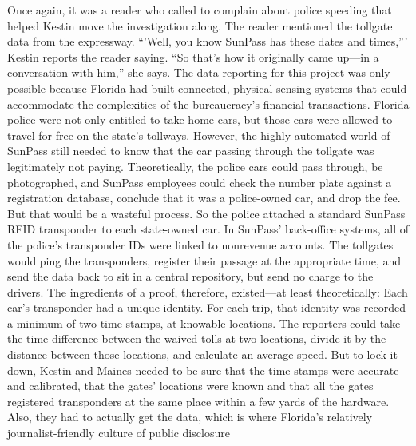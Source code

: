 Once again, it was a reader who called to complain about police speeding
that helped Kestin move the investigation along. The reader mentioned the
tollgate data from the expressway. ``'Well, you know SunPass has these dates
and times,''' Kestin reports the reader saying. ``So that's how it originally
came up—in a conversation with him,'' she says.
The data reporting for this project was only possible because Florida had
built connected, physical sensing systems that could accommodate the
complexities of the bureaucracy's financial transactions. Florida police were
not only entitled to take-home cars, but those cars were allowed to travel
for free on the state's tollways. However, the highly automated world of
SunPass still needed to know that the car passing through the tollgate was
legitimately not paying. Theoretically, the police cars could pass through,
be photographed, and SunPass employees could check the number plate
against a registration database, conclude that it was a police-owned car, and
drop the fee. But that would be a wasteful process. So the police attached a
standard SunPass RFID transponder to each state-owned car. In SunPass'
back-office systems, all of the police's transponder IDs were linked to nonrevenue
accounts. The tollgates would ping the transponders, register their
passage at the appropriate time, and send the data back to sit in a central
repository, but send no charge to the drivers.
The ingredients of a proof, therefore, existed—at least theoretically: Each
car's transponder had a unique identity. For each trip, that identity was
recorded a minimum of two time stamps, at knowable locations. The
reporters could take the time difference between the waived tolls at two
locations, divide it by the distance between those locations, and calculate
an average speed.
But to lock it down, Kestin and Maines needed to be sure that the time
stamps were accurate and calibrated, that the gates' locations were known
and that all the gates registered transponders at the same place within a
few yards of the hardware. Also, they had to actually get the data, which
is where Florida's relatively journalist-friendly culture of public disclosure

